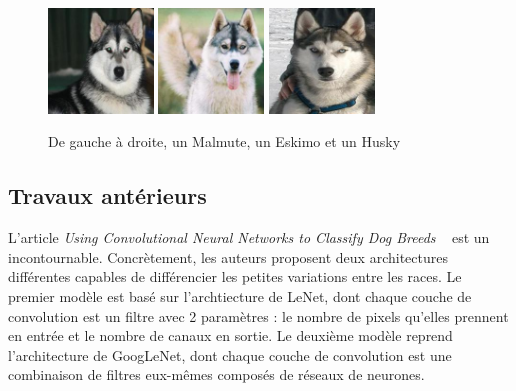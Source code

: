 \documentclass{article}
\begin{document}
\begin{figure}[htbp]
    \centering
    \includegraphics[width=2.8cm]{../dataset/test/n02110063-malamute/n02110063_11838.jpg}\hfill 
    \includegraphics[width=2.8cm]{../dataset/test/n02109961-Eskimo_dog/n02109961_623.jpg}\hfill 
    \includegraphics[width=2.8cm]{../dataset/test/n02110185-Siberian_husky/n02110185_7564.jpg} 
    \caption{De gauche à droite, un Malmute, un Eskimo et un Husky}
    \label{1} 
\end{figure} 


\subsection{Travaux antérieurs}
L'article \textit{Using Convolutional Neural Networks to Classify Dog Breeds} ~\cite{fcdh_FinalReport} est un incontournable. Concrètement, les auteurs proposent  deux architectures différentes capables de différencier les petites variations entre les races. Le premier modèle est basé sur l'archtiecture de LeNet, dont chaque couche de convolution est un filtre avec 2 paramètres : le nombre de pixels qu’elles prennent en entrée et le nombre de canaux en sortie. Le deuxième modèle reprend l'architecture de GoogLeNet, dont chaque couche de convolution est une combinaison de filtres eux-mêmes composés de réseaux de neurones.
\end{document}
